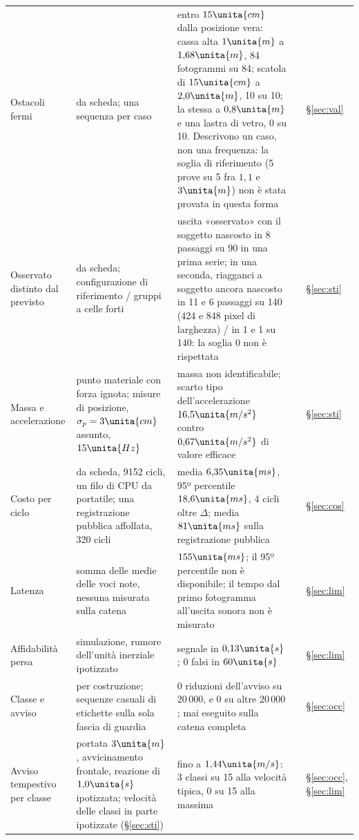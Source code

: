 \begin{table}[p]
\begin{tabularx}{\textwidth}{@{}>{\RaggedRight\arraybackslash}p{2.8cm}>{\RaggedRight\arraybackslash}p{4.1cm}L>{\RaggedRight\arraybackslash}p{1.2cm}>{\RaggedRight\arraybackslash}p{1.05cm}@{}}
Ostacoli fermi & da scheda; una sequenza per caso & entro $15\unita{cm}$ dalla posizione vera: cassa alta $1\unita{m}$ a $1{,}68\unita{m}$, 84 fotogrammi su 84; scatola di $15\unita{cm}$ a $2{,}0\unita{m}$, 10 su 10; la stessa a $0{,}8\unita{m}$ e una lastra di vetro, 0 su 10. Descrivono un caso, non una frequenza: la soglia di riferimento (5 prove su 5 fra $1{,}1$ e $3\unita{m}$) non è stata provata in questa forma &  & \S\ref{sec:val}\\
Osservato distinto dal previsto & da scheda; configurazione di riferimento / gruppi a celle forti & uscita «osservato» con il soggetto nascosto in 8 passaggi su 90 in una prima serie; in una seconda, riagganci a soggetto ancora nascosto in 11 e 6 passaggi su 140 (424 e 848 pixel di larghezza) / in 1 e 1 su 140: la soglia 0 non è rispettata &  & \S\ref{sec:sti}\\
Massa e accelerazione & punto materiale con forza ignota; misure di posizione, $\sigma_p=3\unita{cm}$ assunto, $15\unita{Hz}$ & massa non identificabile; scarto tipo dell'accelerazione $16{,}5\unita{m/s^2}$ contro $0{,}67\unita{m/s^2}$ di valore efficace &  & \S\ref{sec:sti}\\
Costo per ciclo & da scheda, 9152 cicli, un filo di CPU da portatile; una registrazione pubblica affollata, 320 cicli & media $6{,}35\unita{ms}$, 95º percentile $18{,}6\unita{ms}$, 4 cicli oltre $\Delta$; media $81\unita{ms}$ sulla registrazione pubblica &  & \S\ref{sec:cos}\\
Latenza & somma delle medie delle voci note, nessuna misurata sulla catena & $155\unita{ms}$; il 95º percentile non è disponibile; il tempo dal primo fotogramma all'uscita sonora non è misurato &  & \S\ref{sec:lim}\\
Affidabilità persa & simulazione, rumore dell'unità inerziale ipotizzato & segnale in $0{,}13\unita{s}$; 0 falsi in $60\unita{s}$ &  & \S\ref{sec:lim}\\
Classe e avviso & per costruzione; sequenze casuali di etichette sulla sola fascia di guardia & 0 riduzioni dell'avviso su $20\,000$, e 0 su altre $20\,000$; mai eseguito sulla catena completa &  & \S\ref{sec:occ}\\
Avviso tempestivo per classe & portata $3\unita{m}$, avvicinamento frontale, reazione di $1{,}0\unita{s}$ ipotizzata; velocità delle classi in parte ipotizzate (\S\ref{sec:sti}) & fino a $1{,}44\unita{m/s}$: 3 classi su 15 alla velocità tipica, 0 su 15 alla massima &  & \S\ref{sec:occ}, \S\ref{sec:lim}\\

\end{tabularx}
\end{table}
